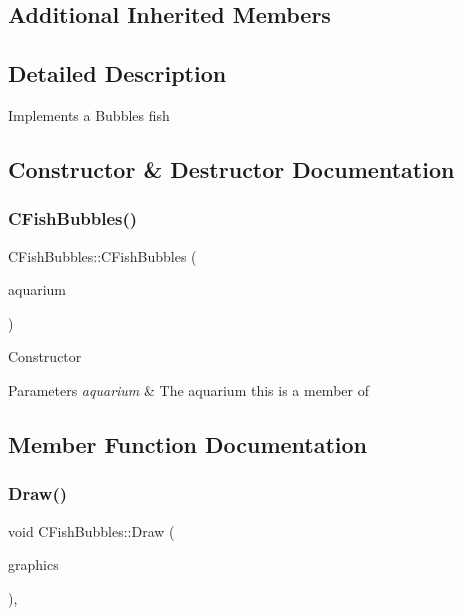 \subsection*{Additional Inherited Members}


\subsection{Detailed Description}
Implements a Bubbles fish 

\subsection{Constructor \& Destructor Documentation}
\mbox{\label{class_c_fish_bubbles_a6ddfdd2f56bd59205792c2faebc4d724}} 
\subsubsection{\texorpdfstring{CFishBubbles()}{CFishBubbles()}}
{\footnotesize\ttfamily C\+Fish\+Bubbles\+::\+C\+Fish\+Bubbles (\begin{DoxyParamCaption}\item[{\mbox{\hyperlink{class_c_aquarium}{C\+Aquarium}} $\ast$}]{aquarium }\end{DoxyParamCaption})}

Constructor 
\begin{DoxyParams}{Parameters}
{\em aquarium} & The aquarium this is a member of \\
\hline
\end{DoxyParams}


\subsection{Member Function Documentation}
\mbox{\label{class_c_fish_bubbles_aab256406ae44edb059c3acdaf07ebd12}} 
\subsubsection{\texorpdfstring{Draw()}{Draw()}}
{\footnotesize\ttfamily void C\+Fish\+Bubbles\+::\+Draw (\begin{DoxyParamCaption}\item[{Gdiplus\+::\+Graphics $\ast$}]{graphics }\end{DoxyParamCaption})\hspace{0.3cm}{\ttfamily [override]}, {\ttfamily [virtual]}}

